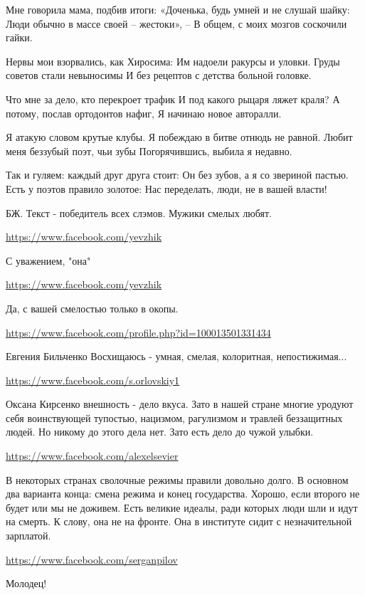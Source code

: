 \documentclass[a4paper,11pt]{extreport}
\begin{document}
\begin{itemize}
\begin{itemize}
Мне говорила мама, подбив итоги:
«Доченька, будь умней и не слушай шайку:
Люди обычно в массе своей – жестоки», –
В общем, с моих мозгов соскочили гайки.

Нервы мои взорвались, как Хиросима:
Им надоели ракурсы и уловки.
Груды советов стали невыносимы
И без рецептов с детства больной головке.

Что мне за дело, кто перекроет трафик
И под какого рыцаря ляжет краля?
А потому, послав ортодонтов нафиг,
Я начинаю новое авторалли.

Я атакую словом крутые клубы.
Я побеждаю в битве отнюдь не равной.
Любит меня беззубый поэт, чьи зубы
Погорячившись, выбила я недавно.

Так и гуляем: каждый друг друга стоит:
Он без зубов, а я со звериной пастью.
Есть у поэтов правило золотое:
Нас переделать, люди, не в вашей власти!

БЖ. Текст - победитель всех слэмов. Мужики смелых любят.

\url{https://www.facebook.com/yevzhik}

С уважением, "она"

\url{https://www.facebook.com/yevzhik}

Да, с вашей смелостью только в окопы.

\url{https://www.facebook.com/profile.php?id=100013501331434}

Евгения Бильченко Восхищаюсь - умная, смелая, колоритная, непостижимая...

\url{https://www.facebook.com/s.orlovskiy1}

Оксана Кирсенко внешность - дело вкуса. Зато в нашей стране многие уродуют себя воинствующей тупостью, нацизмом, рагулизмом и травлей беззащитных людей. Но никому до этого дела нет. Зато есть дело до чужой улыбки.

\end{itemize}
\url{https://www.facebook.com/alexelsevier}

В некоторых странах сволочные режимы правили довольно долго. В основном два варианта конца: смена режима и конец государства. Хорошо, если второго не будет или мы не доживем. Есть великие идеалы, ради которых люди шли и идут на смерть. К слову, она не на фронте. Она в институте сидит с незначительной зарплатой.

\url{https://www.facebook.com/serganpilov}

Молодец!


\end{itemize}
\end{document}
